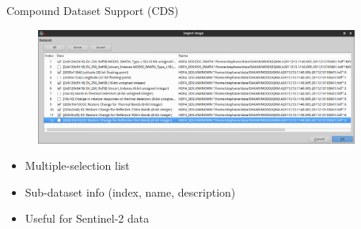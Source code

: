 \documentclass[smaller]{beamer}
\begin{document}
\begin{frame}{Compound Dataset Support (CDS)}      

\begin{figure}[ht]
\begin{center}
\includegraphics[height=1.5in]{images/2016-06-06_MVD_Compound_Dataset_Support.png}
\end{center}
\end{figure}

\begin{itemize}
   \item Multiple-selection list
   \item Sub-dataset info (index, name, description)
   \item Useful for Sentinel-2 data
\end{itemize}

\end{frame} 
\end{document}
